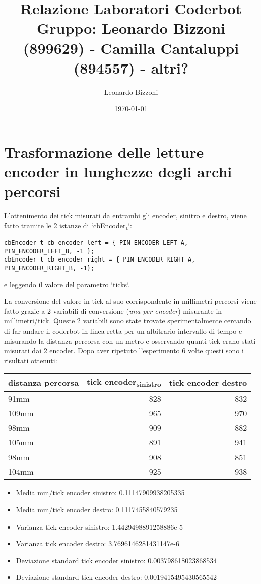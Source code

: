\documentclass[11pt]{article}
\author{Leonardo Bizzoni}
\date{\today}
\title{Relazione Laboratori Coderbot\\\medskip
\large Gruppo: Leonardo Bizzoni (899629) - Camilla Cantaluppi (894557) - altri?}
\begin{document}
\maketitle
\tableofcontents

\section{Trasformazione delle letture encoder in lunghezze degli archi percorsi}
\label{sec:org4604f05}
L'ottenimento dei tick misurati da entrambi gli encoder, sinitro e destro, viene fatto tramite le 2 istanze di `cbEncoder\textsubscript{t}`:
\begin{verbatim}
cbEncoder_t cb_encoder_left = { PIN_ENCODER_LEFT_A, PIN_ENCODER_LEFT_B, -1 };
cbEncoder_t cb_encoder_right = { PIN_ENCODER_RIGHT_A, PIN_ENCODER_RIGHT_B, -1};
\end{verbatim}
e leggendo il valore del parametro `ticks`.

La conversione del valore in tick al suo corrispondente in millimetri percorsi viene fatto grazie a 2 variabili di conversione (\emph{una per encoder}) misurante in millimetri/tick.
Queste 2 variabili sono state trovate sperimentalmente cercando di far andare il coderbot in linea retta per un albitrario intervallo di tempo e misurando la distanza percorsa con un metro e osservando quanti tick erano stati misurati dai 2 encoder. Dopo aver ripetuto l'esperimento 6 volte questi sono i risultati ottenuti:
\begin{center}
\begin{tabular}{lrr}
distanza percorsa & tick encoder\textsubscript{sinistro} & tick encoder destro\\
\hline
91mm & 828 & 832\\
109mm & 965 & 970\\
98mm & 909 & 882\\
105mm & 891 & 941\\
98mm & 908 & 851\\
104mm & 925 & 938\\
\end{tabular}
\end{center}

\begin{itemize}
\item Media mm/tick encoder sinistro:            0.11147909938205335
\item Media mm/tick encoder destro:              0.1117455840579235
\item Varianza tick encoder sinistro:            1.4429498891258886e-5
\item Varianza tick encoder destro:              3.7696146281431147e-6
\item Deviazione standard tick encoder sinistro: 0.003798618023868534
\item Deviazione standard tick encoder destro:   0.0019415495430565542
\end{itemize}
\end{document}
